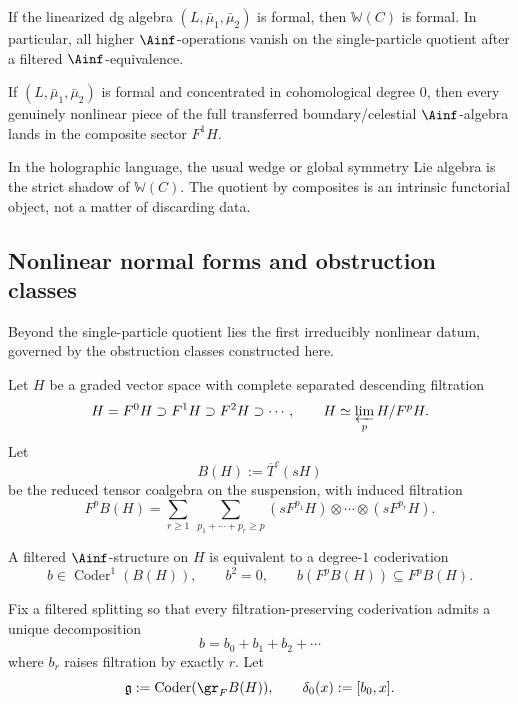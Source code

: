 \begin{corollary}
\label{cor:cbt-single-particle-rigidity}
\ClaimStatusProvedHere
If the linearized dg algebra $(L,\bar\mu_1,\bar\mu_2)$ is formal, then $\mathbb{W}(C)$ is formal. In particular, all higher $\Ainf$-operations vanish on the single-particle quotient after a filtered $\Ainf$-equivalence.
\end{corollary}

\begin{corollary}
\label{cor:cbt-nonlinear-location}
\ClaimStatusProvedHere
If $(L,\bar\mu_1,\bar\mu_2)$ is formal and concentrated in cohomological degree $0$, then every genuinely nonlinear piece of the full transferred boundary/celestial $\Ainf$-algebra lands in the composite sector $F^1H$.
\end{corollary}

\begin{remark}
\label{rem:cbt-wedge-functorial}
In the holographic language, the usual wedge or global symmetry Lie algebra is the strict shadow of $\mathbb{W}(C)$. The quotient by composites is an intrinsic functorial object, not a matter of discarding data.
\end{remark}

\subsection{Nonlinear normal forms and obstruction classes}
\label{sec:cbt-nonlinear-normal}

Beyond the single-particle quotient lies the first irreducibly nonlinear datum, governed by the obstruction classes constructed here.

Let $H$ be a graded vector space with complete separated descending filtration
\[
H=F^0H\supset F^1H\supset F^2H\supset \cdots,
\qquad
H\simeq \varprojlim_p H/F^pH.
\]
Let
\[
B(H):=\overline{T}^c(sH)
\]
be the reduced tensor coalgebra on the suspension, with induced filtration
\[
F^pB(H)=
\sum_{r\ge1}\ \sum_{p_1+\cdots+p_r\ge p}
(sF^{p_1}H)\otimes\cdots\otimes(sF^{p_r}H).
\]

A filtered $\Ainf$-structure on $H$ is equivalent to a degree-$1$ coderivation
\[
b\in \operatorname{Coder}^1(B(H)),
\qquad
b^2=0,
\qquad
b(F^pB(H))\subseteq F^pB(H).
\]

Fix a filtered splitting so that every filtration-preserving coderivation admits a unique decomposition
\[
b=b_0+b_1+b_2+\cdots
\]
where $b_r$ raises filtration by exactly $r$. Let
\[
\mathfrak g:=\operatorname{Coder}(\gr_FB(H)),
\qquad
\delta_0(x):=[b_0,x].
\]

